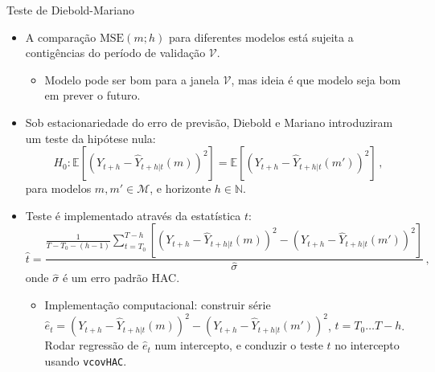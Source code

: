 \documentclass[11pt]{beamer}
\begin{document}
\begin{frame}{Teste de Diebold-Mariano}
	\begin{itemize}
		\item A comparação $\text{MSE}(m;h)$ para diferentes modelos está sujeita a contigências do período de validação $\mathcal{V}$.
		\begin{itemize}
			\item Modelo pode ser bom para a janela $\mathcal{V}$, mas ideia é que modelo seja bom em prever o futuro.
		\end{itemize}
		\item Sob estacionariedade do erro de previsão, Diebold e Mariano introduziram um teste da hipótese nula:
		$$H_0: \mathbb{E}[(Y_{t+h} - \hat{Y}_{t+h|t}(m))^2] = \mathbb{E}[(Y_{t+h} - \hat{Y}_{t+h|t}(m'))^2] \, ,$$
		para modelos $m,m' \in \mathcal{M}$, e horizonte $h \in \mathbb{N}$.
		\item Teste é implementado através da estatística $t$:
		$$\hat t = \frac{\frac{1}{T-T_0-(h-1)}\sum_{t=T_0}^{T-h} [(Y_{t+h} - \hat{Y}_{t+h|t}(m))^2 -(Y_{t+h} - \hat{Y}_{t+h|t}(m'))^2 ]}{\hat \sigma}\,,$$
		onde $\hat \sigma$ é um erro padrão HAC.
		\begin{itemize}
			\item Implementação computacional: construir série $\hat{e}_t = (Y_{t+h} - \hat{Y}_{t+h|t}(m))^2 -(Y_{t+h} - \hat{Y}_{t+h|t}(m'))^2$, $t = T_0\ldots T-h$. Rodar regressão de $\hat{e}_t$ num intercepto, e conduzir o teste $t$ no intercepto usando \texttt{vcovHAC}.
		\end{itemize}  
	\end{itemize}
\end{frame}
\end{document}
